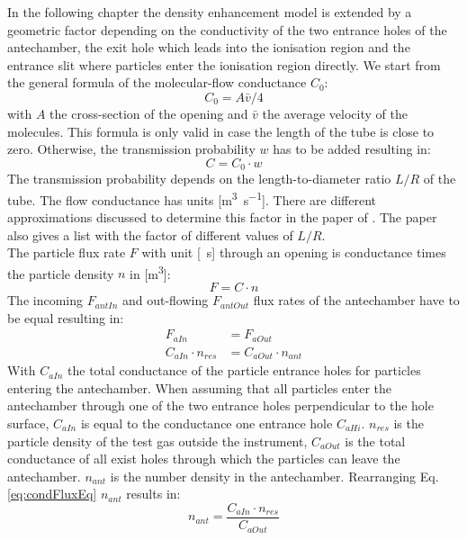 		In the following chapter the density enhancement model is extended by a geometric factor depending on the conductivity of the two entrance holes of the antechamber, the exit hole which leads into the ionisation region and the entrance slit where particles enter the ionisation region directly. We start from the general formula of the molecular-flow conductance $C_0$:
		\begin{equation}
			C_0 = A\bar{v}/4
			\label{eq:theoMolFlowCondC0}
		\end{equation}
		with $A$ the cross-section of the opening and $\bar{v}$ the average velocity of the molecules. This formula is only valid in case the length of the tube is close to zero. Otherwise, the transmission probability $w$ has to be added resulting in:
		\begin{equation}
			C = C_0 \cdot w
			\label{eq:theoMolFlowCondCEff}
		\end{equation}
		The transmission probability depends on the length-to-diameter ratio $L/R$ of the tube. The flow conductance has units [\si{\cubic\meter\per\second}]. There are different approximations discussed to determine this factor in the paper of \cite{molFlowTubeTransm_Essen1976}. The paper also gives a list with the factor of different values of $L/R$.\\
		The particle flux rate $F$ with unit [\si{\per\second}] through an opening is conductance times the particle density $n$ in [\si{\cubic\meter}]:
		\begin{equation}
			F = C\cdot n
		\end{equation}
		The incoming $F_{antIn}$ and out-flowing $F_{antOut}$ flux rates of the antechamber have to be equal resulting in:
		\begin{align}
			F_{aIn} &= F_{aOut}\\
			C_{aIn}\cdot n_{res} &= C_{aOut} \cdot n_{ant}
			\label{eq:condFluxEq}
		\end{align}
		With $C_{aIn}$ the total conductance of the particle entrance holes for particles entering the antechamber. When assuming that all particles enter the antechamber through one of the two entrance holes perpendicular to the hole surface, $C_{aIn}$ is equal to the conductance one entrance hole $C_{aHi}$. $n_{res}$ is the particle density of the test gas outside the instrument, $C_{aOut}$ is the total conductance of all exist holes through which the particles can leave the antechamber. $n_{ant}$ is the number density in the antechamber. Rearranging Eq.\eqref{eq:condFluxEq} $n_{ant}$ results in:
		\begin{equation}
			n_{ant} = \frac{C_{aIn}\cdot n_{res}}{C_{aOut}}
		\end{equation}
